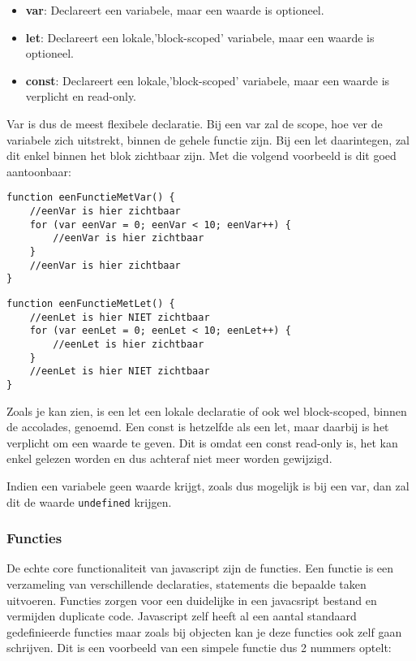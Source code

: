 \begin{itemize}
	\item \textbf{var}: Declareert een variabele, maar een waarde is optioneel.
	\item \textbf{let}: Declareert een lokale,'block-scoped' variabele, maar een waarde is optioneel.
	\item \textbf{const}: Declareert een lokale,'block-scoped' variabele, maar een waarde is verplicht en read-only.
\end{itemize}

Var is dus de meest flexibele declaratie. Bij een var zal de scope, hoe ver de variabele zich uitstrekt, binnen de gehele functie zijn. Bij een let daarintegen, zal dit enkel binnen het blok zichtbaar zijn. Met die volgend voorbeeld is dit goed aantoonbaar:

\begin{lstlisting}[frame=single, caption=Een functie met var]
function eenFunctieMetVar() {
	//eenVar is hier zichtbaar
	for (var eenVar = 0; eenVar < 10; eenVar++) {
		//eenVar is hier zichtbaar
	}
	//eenVar is hier zichtbaar
}
\end{lstlisting}

\begin{lstlisting}[frame=single, caption=Een functie met let]
function eenFunctieMetLet() {
	//eenLet is hier NIET zichtbaar
	for (var eenLet = 0; eenLet < 10; eenLet++) {
		//eenLet is hier zichtbaar
	}
	//eenLet is hier NIET zichtbaar
}
\end{lstlisting}

Zoals je kan zien, is een let een lokale declaratie of ook wel block-scoped, binnen de accolades, genoemd. Een const is hetzelfde als een let, maar daarbij is het verplicht om een waarde te geven. Dit is omdat een const read-only is, het kan enkel gelezen worden en dus achteraf niet meer worden gewijzigd.

Indien een variabele geen waarde krijgt, zoals dus mogelijk is bij een var, dan zal dit de waarde \lstinline[basicstyle=\ttfamily\color{red}]|undefined| krijgen.

\subsubsection{Functies}
\label{sssec:functies}
De echte core functionaliteit van javascript zijn de functies. Een functie is een verzameling van verschillende declaraties, statements die bepaalde taken uitvoeren. Functies zorgen voor een duidelijke in een javacsript bestand en vermijden duplicate code. Javascript zelf heeft al een aantal standaard gedefinieerde functies maar zoals bij objecten kan je deze functies ook zelf gaan schrijven. Dit is een voorbeeld van een simpele functie dus 2 nummers optelt:

